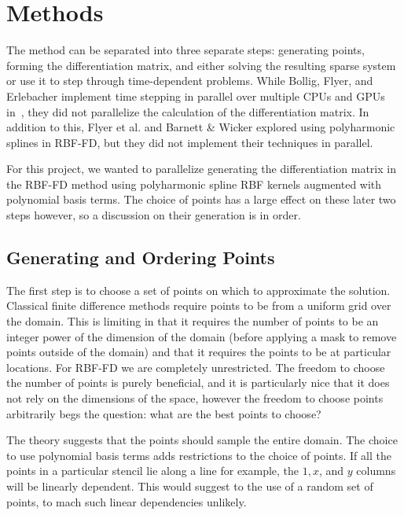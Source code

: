\documentclass[12pt]{article}
\begin{document}
\section{Methods}

	The method can be separated into three separate steps: generating points, forming the differentiation matrix, and either solving the resulting sparse system or use it to step through time-dependent problems. While Bollig, Flyer, and Erlebacher implement time stepping in parallel over multiple CPUs and GPUs in~\cite{Bollig2012}, they did not parallelize the calculation of the differentiation matrix. In addition to this, Flyer et al. \cite{Flyer2016-1}\cite{Flyer2017-2} and Barnett \& Wicker \cite{FlyerBarnettWicker2016} explored using polyharmonic splines in RBF-FD, but they did not implement their techniques in parallel.
	
	For this project, we wanted to parallelize generating the differentiation matrix in the RBF-FD method using polyharmonic spline RBF kernels augmented with polynomial basis terms. The choice of points has a large effect on these later two steps however, so a discussion on their generation is in order.

\subsection{Generating and Ordering Points}
The first step is to choose a set of points on which to approximate the solution. Classical finite difference methods require points to be from a uniform grid over the domain. This is limiting in that it requires the number of points to be an integer power of the dimension of the domain (before applying a mask to remove points outside of the domain) and that it requires the points to be at particular locations. For RBF-FD we are completely unrestricted. The freedom to choose the number of points is purely beneficial, and it is particularly nice that it does not rely on the dimensions of the space, however the freedom to choose points arbitrarily begs the question: what are the best points to choose?

The theory suggests that the points should sample the entire domain. The choice to use polynomial basis terms adds restrictions to the choice of points. If all the points in a particular stencil lie along a line for example, the $1, x$, and $y$ columns will be linearly dependent. This would suggest to the use of a random set of points, to mach such linear dependencies unlikely. 
\end{document}
